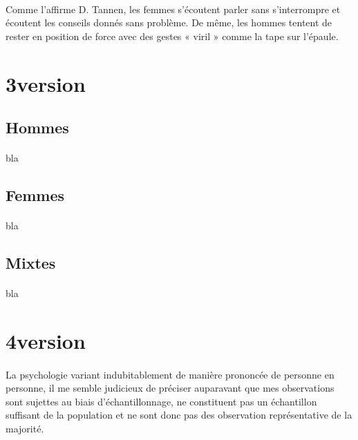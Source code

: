 \paragraph{}
Comme l’affirme D. Tannen, les femmes s’écoutent parler sans s’interrompre et écoutent les conseils donnés sans problème. De même, les hommes tentent de rester en position de force avec des gestes « viril » comme la tape sur l’épaule.

\section{3\ieme version}
\paragraph{}
\subsection{Hommes}
\paragraph{}
bla

\subsection{Femmes}
\paragraph{}
bla

\subsection{Mixtes}
\paragraph{}
bla

\section{4\ieme version}
\paragraph{}
La psychologie variant indubitablement de manière prononcée de personne en
personne, il me semble judicieux de préciser auparavant que mes observations
sont sujettes au biais d’échantillonnage, ne constituent pas un échantillon suffisant de la population et ne sont donc pas des observation représentative de la majorité.

